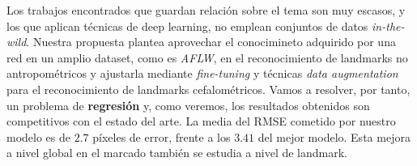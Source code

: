 \medskip

\noindent Los trabajos encontrados que guardan relación sobre el tema son muy escasos, y los que aplican técnicas de deep learning, no emplean conjuntos de datos \textit{in-the-wild}. Nuestra propuesta plantea aprovechar el conocimineto adquirido por una red en un amplio dataset, como es \textit{AFLW}, en el reconocimiento de landmarks no antropométricos y ajustarla mediante \textit{fine-tuning}  y técnicas \textit{data augmentation}  para el reconocimiento de landmarks cefalométricos. Vamos a resolver, por tanto, un problema de \textbf{regresión} y, como veremos, los resultados obtenidos son competitivos con el estado del arte. La media del RMSE cometido por nuestro modelo es de $2.7$ píxeles de error, frente a los $3.41$ del mejor modelo. Esta mejora a nivel global en el marcado también se estudia a nivel de landmark.

\endinput
